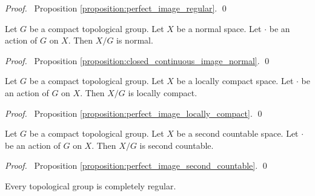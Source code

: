 \begin{proof}
    \pf\ Proposition \ref{proposition:perfect_image_regular}. \qed
\end{proof}

\begin{corollary}
    Let $G$ be a compact topological group. Let $X$ be a normal space.
    Let $\cdot$ be an action of $G$ on $X$. Then $X / G$ is normal.
\end{corollary}

\begin{proof}
    \pf\ Proposition \ref{proposition:closed_continuous_image_normal}. \qed
\end{proof}

\begin{corollary}
    Let $G$ be a compact topological group. Let $X$ be a locally compact space.
    Let $\cdot$ be an action of $G$ on $X$. Then $X / G$ is locally compact.
\end{corollary}

\begin{proof}
    \pf\ Proposition \ref{proposition:perfect_image_locally_compact}. \qed
\end{proof}

\begin{corollary}
    Let $G$ be a compact topological group. Let $X$ be a second countable space.
    Let $\cdot$ be an action of $G$ on $X$. Then $X / G$ is second countable.
\end{corollary}

\begin{proof}
    \pf\ Proposition \ref{proposition:perfect_image_second_countable}. \qed
\end{proof}

\begin{proposition}
    Every topological group is completely regular.
\end{proposition}


